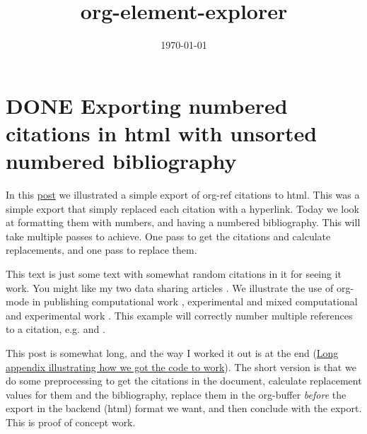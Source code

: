 \documentclass[11pt]{article}
\date{\today}
\title{org-element-explorer}
\begin{document}
\section{{\bfseries\sffamily DONE} Exporting numbered citations in html with unsorted numbered bibliography}
\label{sec-1}

In this \href{http://kitchingroup.cheme.cmu.edu/blog/2014/05/17/Exporting-citations-in-html/}{post} we illustrated a simple export of org-ref citations to html. This was a simple export that simply replaced each citation with a hyperlink. Today we look at formatting them with numbers, and having a numbered bibliography. This will take multiple passes to achieve. One pass to get the citations and calculate replacements, and one pass to replace them.

This text is just some text with somewhat random citations in it for seeing it work. You might like my two data sharing articles \cite{kitchin-2015-examp,kitchin-2015-data-surfac-scien}. We illustrate the use of org-mode in publishing computational work \cite{xu-2015-tunin-oxide,mehta-2014-ident-poten,curnan-2014-effec-concen}, experimental \cite{hallenbeck-2013-effec-o2} and mixed computational and experimental work \cite{miller-2014-simul-temper,boes-2015-estim-bulk}. This example will correctly number multiple references to a citation, e.g.  \cite{kitchin-2015-examp} and \cite{kitchin-2015-data-surfac-scien}.

This post is somewhat long, and the way I worked it out is at the end (\hyperref[sec-1-2]{Long appendix illustrating how we got the code to work}). The short version is that we do some preprocessing to get the citations in the document, calculate replacement values for them and the bibliography, replace them in the org-buffer \emph{before} the export in the backend (html) format we want, and then conclude with the export. This is proof of concept work.
\end{document}
